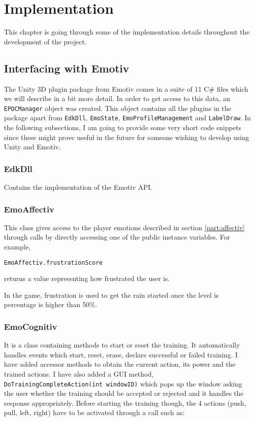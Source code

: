 \chapter{Implementation}
\label{cha:implementation}

This chapter is going through some of the implementation details throughout the development of the project.

\section{Interfacing with Emotiv}
The Unity 3D plugin package from Emotiv comes in a suite of 11 C\# files which we will describe in a bit more detail. In order to get access to this data, an  \texttt{EPOCManager} object was created. This object contains all the plugins in the package apart from  \texttt{EdkDll}, \texttt{EmoState}, \texttt{EmoProfileManagement} and \texttt{LabelDraw}. In the following subsections, I am going to provide some very short code snippets since these might prove useful in the future for someone wishing to develop using Unity and Emotiv.

\subsection{EdkDll}
Contains the implementation of the Emotiv API.

\subsection{EmoAffectiv} 
This class gives access to the player emotions described in section \ref{part:affectiv} through calls by directly accessing one of the public instance variables. For example,

\begin{Verbatim}[frame=single, framesep=3mm, label={[Beginning of code]End of code}]
EmoAffectiv.frustrationScore
\end{Verbatim}

returns a value representing how frustrated the user is.

In the game, frustration is used to get the rain started once the level is percentage is higher than 50\%. 

\subsection{EmoCognitiv} 
It is a class containing methods to start or reset the training. It automatically handles events which start, reset, erase, declare successful or failed training. I have added accessor methods to obtain the current action, its power and the trained actions. I have also added a GUI method, \texttt{DoTrainingCompleteAction(int windowID)} which pops up the window asking the user whether the training should be accepted or rejected and it handles the response appropriately. Before starting the training though, the 4 actions (push, pull, left, right) have to be activated through a call such as: 

